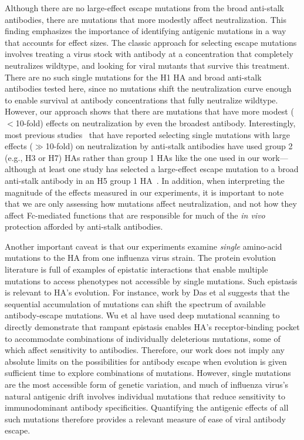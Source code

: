 \documentclass[11pt]{article}
\begin{document}
Although there are no large-effect escape mutations from the broad anti-stalk antibodies, there are mutations that more modestly affect neutralization.
This finding emphasizes the importance of identifying antigenic mutations in a way that accounts for effect sizes.
The classic approach for selecting escape mutations involves treating a virus stock with antibody at a concentration that completely neutralizes wildtype, and looking for viral mutants that survive this treatment\cite{yewdell1979antigenic,webster1980determination}.
There are no such single mutations for the H1 HA and broad anti-stalk antibodies tested here, since no mutations shift the neutralization curve enough to enable survival at antibody concentrations that fully neutralize wildtype.
However, our approach shows that there are mutations that have more modest ($<$10-fold) effects on neutralization by even the broadest antibody. 
Interestingly, most previous studies~\cite{chai2016two,ekiert2011highly,friesen2014common,dunand2015preexisting} that have reported selecting single mutations with large effects ($\gg$10-fold) on neutralization by anti-stalk antibodies have used group 2 (e.g., H3 or H7) HAs rather than group 1 HAs like the one used in our work---although at least one study has selected a large-effect escape mutation to a broad anti-stalk antibody in an H5 group 1 HA~\cite{throsby2008heterosubtypic}.
In addition, when interpreting the magnitude of the effects measured in our experiments, it is important to note that we are only assessing how mutations affect neutralization, and not how they affect Fc-mediated functions that are responsible for much of the \textit{in vivo} protection afforded by anti-stalk antibodies\cite{dilillo2014broadly,dilillo2016broadly}.

Another important caveat is that our experiments examine \emph{single} amino-acid mutations to the HA from one influenza virus strain.
The protein evolution literature is full of examples of epistatic interactions that enable multiple mutations to access phenotypes not accessible by single mutations\cite{gong2013stability,harms2014historical,starr2017alternative}.
Such epistasis is relevant to HA's evolution.  
For instance, work by Das et al\cite{das2013defining} suggests that the sequential accumulation of mutations can shift the spectrum of available antibody-escape mutations.
Wu et al\cite{wu2017diversity} have used deep mutational scanning to directly demonstrate that rampant epistasis enables HA's receptor-binding pocket to accommodate combinations of individually deleterious mutations, some of which affect sensitivity to antibodies.
Therefore, our work does not imply any absolute limits on the possibilities for antibody escape when evolution is given sufficient time to explore combinations of mutations.
However, single mutations are the most accessible form of genetic variation, and much of influenza virus's natural antigenic drift involves individual mutations that reduce sensitivity to immunodominant antibody specificities\cite{yewdell1979antigenic,webster1980determination,koel2013substitutions,chambers2015identification,petrie2016antibodies,neher2016prediction}.
Quantifying the antigenic effects of all such mutations therefore provides a relevant measure of ease of viral antibody escape. 
\end{document}

